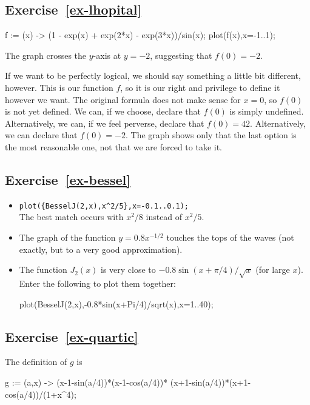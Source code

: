 \documentclass[a4paper,10pt]{amsbook}
\begin{document}
\subsection*{Exercise~\ref{ex-lhopital}}
\begin{pcodeblock}
 f := (x) -> (1 - exp(x) + exp(2*x) - exp(3*x))/sin(x);
 plot(f(x),x=-1..1);
\end{pcodeblock}
The graph crosses the $y$-axis at $y=-2$, suggesting that $f(0)=-2$. 

If we want to be perfectly logical, we should say something a little
bit different, however.  This is our function $f$, so it is our right
and privilege to define it however we want.  The original formula does
not make sense for $x=0$, so $f(0)$ is not yet defined.  We can, if we
choose, declare that $f(0)$ is simply undefined.  Alternatively, we
can, if we feel perverse, declare that $f(0)=42$.  Alternatively, we
can declare that $f(0)=-2$.  The graph shows only that the last option
is the most reasonable one, not that we are forced to take it. 

\subsection*{Exercise~\ref{ex-bessel}}
\begin{itemize}
 \item[(b)] \verb~plot({BesselJ(2,x),x^2/5},x=-0.1..0.1);~\\
  The best match occurs with $x^2/8$ instead of $x^2/5$. 
 \item[(d)] The graph of the function $y=0.8x^{-1/2}$ touches the tops
  of the waves (not exactly, but to a very good approximation). 
 \item[(f)] The function $J_2(x)$ is very close to
  $-0.8\sin(x+\pi/4)/\sqrt{x}$ (for large $x$).  Enter the following
  to plot them together:
\begin{pcodeblock}
  plot({BesselJ(2,x),-0.8*sin(x+Pi/4)/sqrt(x)},x=1..40);
\end{pcodeblock}
\end{itemize}

\subsection*{Exercise~\ref{ex-quartic}}
The definition of $g$ is
\begin{pcodeblock}
  g := (a,x) -> (x-1-sin(a/4))*(x-1-cos(a/4))*
                (x+1-sin(a/4))*(x+1-cos(a/4))/(1+x^4);
\end{pcodeblock}
\end{document}
